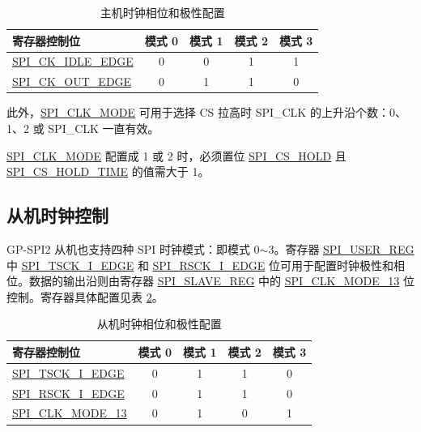 \documentclass[main\_\_CN.tex]{subfiles}
\begin{document}
\begin{table}[H]
    \centering
    \caption{主机时钟相位和极性配置}
    \label{tab:clock-pol-master}
    \begin{tabular}[c]{|p{3.5cm}|c|c|c|c|}
    \hline
    \rowcolor{lightgray}
    寄存器控制位 & 模式 0 & 模式 1 & 模式 2 & 模式 3\\
    \hline
   \hyperref[fielddesc:SPICKIDLEEDGE]{SPI\_CK\_IDLE\_EDGE}  & 0     & 0     & 1     & 1\\
    \hline
   \hyperref[fielddesc:SPICKOUTEDGE]{SPI\_CK\_OUT\_EDGE}   & 0     & 1     & 1     & 0\\
    \hline
    \end{tabular}
\end{table}

此外，\hyperref[fielddesc:SPICLKMODE]{SPI\_CLK\_MODE} 可用于选择 CS 拉高时 SPI\_CLK 的上升沿个数：0、1、2 或 SPI\_CLK 一直有效。 

\begin{tiplisting}
 \hyperref[fielddesc:SPICLKMODE]{SPI\_CLK\_MODE} 配置成 1 或 2 时，必须置位 \hyperref[fielddesc:SPICSHOLD]{SPI\_CS\_HOLD} 且 \hyperref[fielddesc:SPICSHOLDTIME]{SPI\_CS\_HOLD\_TIME} 的值需大于 1。
\end{tiplisting}
\vspace{-1em}

\subsection{从机时钟控制}\label{sec:gp-spi2-slave-clock-control}

GP-SPI2 从机也支持四种 SPI 时钟模式：即模式 0$\sim$3。寄存器 \hyperref[regdesc:SPIUSERREG]{SPI\_USER\_REG} 中 \hyperref[fielddesc:SPITSCKIEDGE]{SPI\_TSCK\_I\_EDGE} 和 \hyperref[fielddesc:SPIRSCKIEDGE]{SPI\_RSCK\_I\_EDGE} 位可用于配置时钟极性和相位。数据的输出沿则由寄存器 \hyperref[regdesc:SPISLAVEREG]{SPI\_SLAVE\_REG} 中的 \hyperref[fielddesc:SPICLKMODE13]{SPI\_CLK\_MODE\_13} 位控制。寄存器具体配置见表 \ref{tab:clock-pol-slave}。 

\begin{table}[H]
    \centering
    \caption{从机时钟相位和极性配置}
    \label{tab:clock-pol-slave}
    \begin{tabular}[c]{|p{3.5cm}|c|c|c|c|}
    \hline
    \rowcolor{lightgray}
    寄存器控制位 & 模式 0 & 模式 1 & 模式 2 & 模式 3\\
    \hline
   \hyperref[fielddesc:SPITSCKIEDGE]{SPI\_TSCK\_I\_EDGE}   & 0 & 1 & 1 & 0\\
    \hline
   \hyperref[fielddesc:SPIRSCKIEDGE]{SPI\_RSCK\_I\_EDGE}   & 0 & 1 & 1 & 0\\
    \hline
   \hyperref[fielddesc:SPICLKMODE13]{SPI\_CLK\_MODE\_13}     & 0 & 1 & 0 & 1\\
    \hline    
    \end{tabular}
\end{table}
\end{document}
